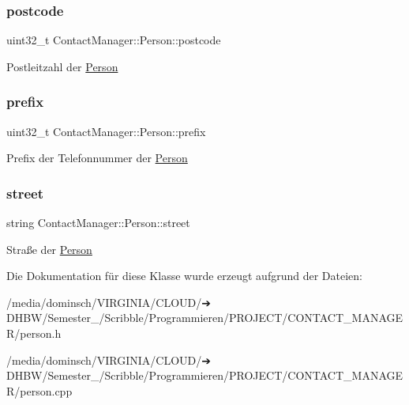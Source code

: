 \mbox{\label{classContactManager_1_1Person_a2fd82a38ead08ec16730736327e6ef63}} 
\subsubsection{\texorpdfstring{postcode}{postcode}}
{\footnotesize\ttfamily uint32\+\_\+t Contact\+Manager\+::\+Person\+::postcode\hspace{0.3cm}{\ttfamily [protected]}}



Postleitzahl der \hyperlink{classContactManager_1_1Person}{Person}

\mbox{\label{classContactManager_1_1Person_ac50dc517f5877c3fb05aea6a52cc543d}} 
\subsubsection{\texorpdfstring{prefix}{prefix}}
{\footnotesize\ttfamily uint32\+\_\+t Contact\+Manager\+::\+Person\+::prefix\hspace{0.3cm}{\ttfamily [protected]}}



Prefix der Telefonnummer der \hyperlink{classContactManager_1_1Person}{Person}

\mbox{\label{classContactManager_1_1Person_aa406cf31ed8b781704ea91aa2efded51}} 
\subsubsection{\texorpdfstring{street}{street}}
{\footnotesize\ttfamily string Contact\+Manager\+::\+Person\+::street\hspace{0.3cm}{\ttfamily [protected]}}



Straße der \hyperlink{classContactManager_1_1Person}{Person}



Die Dokumentation für diese Klasse wurde erzeugt aufgrund der Dateien\+:\begin{DoxyCompactItemize}
\item 
/media/dominsch/\+V\+I\+R\+G\+I\+N\+I\+A/\+C\+L\+O\+U\+D/➔ D\+H\+B\+W/\+Semester\+\_/\+Scribble/\+Programmieren/\+P\+R\+O\+J\+E\+C\+T/\+C\+O\+N\+T\+A\+C\+T\+\_\+\+M\+A\+N\+A\+G\+E\+R/person.\+h\item 
/media/dominsch/\+V\+I\+R\+G\+I\+N\+I\+A/\+C\+L\+O\+U\+D/➔ D\+H\+B\+W/\+Semester\+\_/\+Scribble/\+Programmieren/\+P\+R\+O\+J\+E\+C\+T/\+C\+O\+N\+T\+A\+C\+T\+\_\+\+M\+A\+N\+A\+G\+E\+R/person.\+cpp\end{DoxyCompactItemize}
